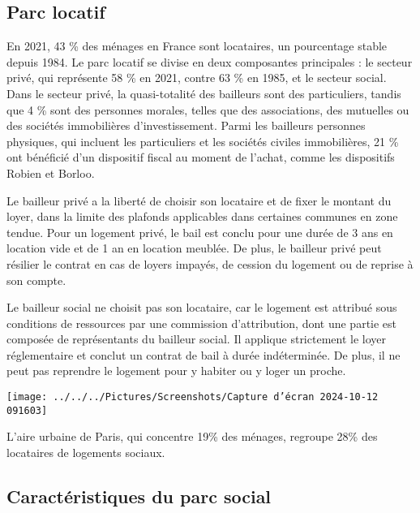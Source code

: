 \documentclass[a4paper, 12pt]{report}
\begin{document}
\subsection{Parc locatif}

En 2021, 43 \% des ménages en France sont locataires, un pourcentage stable depuis 1984. Le parc locatif se divise en deux composantes principales : le secteur privé, qui représente 58 \% en 2021, contre 63 \% en 1985, et le secteur social. Dans le secteur privé, la quasi-totalité des bailleurs sont des particuliers, tandis que 4 \% sont des personnes morales, telles que des associations, des mutuelles ou des sociétés immobilières d’investissement. Parmi les bailleurs personnes physiques, qui incluent les particuliers et les sociétés civiles immobilières, 21 \% ont bénéficié d’un dispositif fiscal au moment de l’achat, comme les dispositifs Robien et Borloo.

Le bailleur privé a la liberté de choisir son locataire et de fixer le montant du loyer, dans la limite des plafonds applicables dans certaines communes en zone tendue. Pour un logement privé, le bail est conclu pour une durée de 3 ans en location vide et de 1 an en location meublée. De plus, le bailleur privé peut résilier le contrat en cas de loyers impayés, de cession du logement ou de reprise à son compte.

Le bailleur social ne choisit pas son locataire, car le logement est attribué sous conditions de ressources par une commission d'attribution, dont une partie est composée de représentants du bailleur social. Il applique strictement le loyer réglementaire et conclut un contrat de bail à durée indéterminée. De plus, il ne peut pas reprendre le logement pour y habiter ou y loger un proche.

\begin{center}
	\texttt{[image: ../../../Pictures/Screenshots/Capture d'écran 2024-10-12 091603]}
\end{center}

L’aire urbaine de Paris, qui concentre 19\% des ménages, regroupe 28\% des locataires de logements sociaux.

\subsection{Caractéristiques du parc social}
\end{document}

